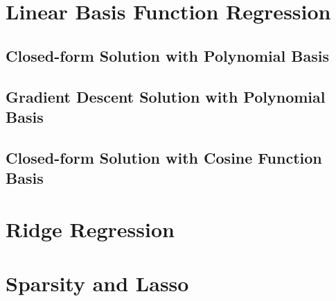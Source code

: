 \documentclass[journal]{IEEEtran}
\begin{document}
\section{Linear Basis Function Regression}

\subsection{Closed-form Solution with Polynomial Basis}

\subsection{Gradient Descent Solution with Polynomial Basis}

\subsection{Closed-form Solution with Cosine Function Basis}

\section{Ridge Regression}

\section{Sparsity and Lasso}
\end{document}
